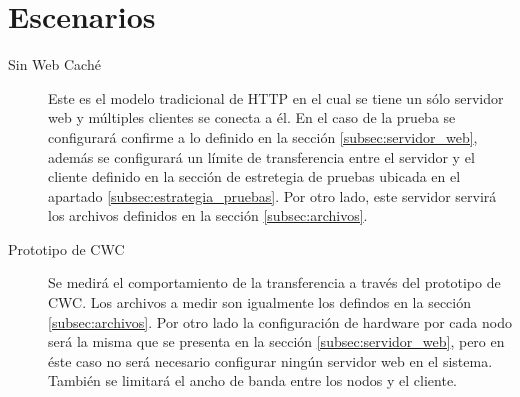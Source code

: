 \section{Escenarios}
\label{sec:escenarios}

\begin{description}
\item[Sin Web Caché] Este es el modelo tradicional de HTTP en el cual se tiene un sólo servidor web y múltiples clientes se conecta a él. En el caso de la prueba se configurará confirme a lo definido en la sección \ref{subsec:servidor_web}, además se configurará un límite de transferencia entre el servidor y el cliente definido en la sección de estretegia de pruebas ubicada en el apartado \ref{subsec:estrategia_pruebas}. Por otro lado, este servidor servirá los archivos definidos en la sección \ref{subsec:archivos}.

\item [Prototipo de CWC] Se medirá el comportamiento de la transferencia a través del prototipo de CWC. Los archivos a medir son igualmente los defindos en la sección  \ref{subsec:archivos}. Por otro lado la configuración de hardware por cada nodo será la misma que se presenta en la sección \ref{subsec:servidor_web}, pero en éste caso no será necesario configurar ningún servidor web en el sistema. También se limitará el ancho de banda entre los nodos y el cliente.
\end{description}
